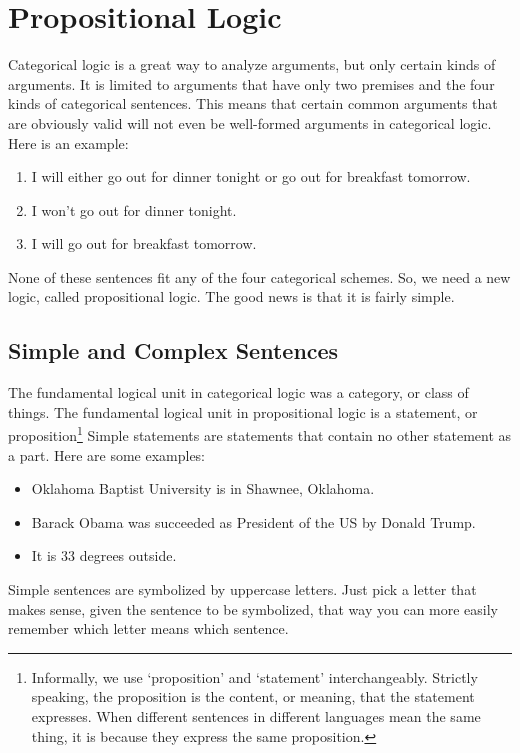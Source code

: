 
\chapter{Propositional Logic}
\label{chap:prop-logic}

Categorical logic is a great way to analyze arguments, but only certain kinds of arguments. It is limited to arguments that have only two premises and the four kinds of categorical sentences. This means that certain common arguments that are obviously valid will not even be well-formed arguments in categorical logic. Here is an example:

\begin{enumerate}
\item
  I will either go out for dinner tonight or go out for breakfast tomorrow.
\item
  I won't go out for dinner tonight.
\item
  I will go out for breakfast tomorrow.
\end{enumerate}

None of these sentences fit any of the four categorical schemes. So, we need a new logic, called propositional logic. The good news is that it is fairly simple.

\section{Simple and Complex Sentences}\label{simple-and-complex-sentences}

The fundamental logical unit in categorical logic was a category, or class of things. The fundamental logical unit in propositional logic is a statement, or proposition\footnote{Informally, we use `proposition' and `statement' interchangeably. Strictly speaking, the proposition is the content, or meaning, that the statement expresses. When different sentences in different languages mean the same thing, it is because they express the same proposition.} Simple statements are statements that contain no other statement as a part. Here are some examples:

\begin{itemize}
\item
  Oklahoma Baptist University is in Shawnee, Oklahoma.
\item
  Barack Obama was succeeded as President of the US by Donald Trump.
\item
  It is 33 degrees outside.
\end{itemize}

Simple sentences are symbolized by uppercase letters. Just pick a letter that makes sense, given the sentence to be symbolized, that way you can more easily remember which letter means which sentence.

